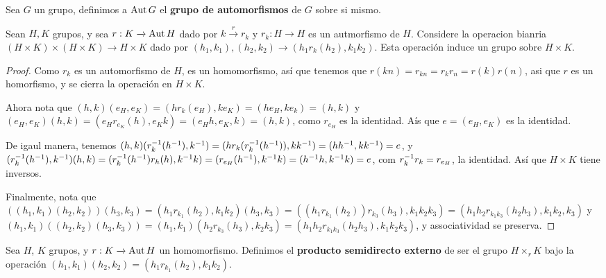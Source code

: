 \begin{definition}
    Sea $G$ un grupo, definimos a $\operatorname{Aut}{G}$ el \textbf{grupo de automorfismos}
    de $G$ sobre si mismo.
\end{definition}

\begin{lemma}\label{}
    Sean $H,K$ grupos, y sea  $r:K \xrightarrow{} \operatorname{Aut}{H}$ dado por $k
    \xrightarrow{r} r_k$ y $r_k:H \xrightarrow{} H$ es un autmorfismo de $H$.
    Considere la operacion bianria  $(H \times K) \times (H \times K)
    \xrightarrow{} H \times K$ dado por $(h_1,k_1),(h_2,k_2) \xrightarrow{}
    (h_1r_k(h_2),k_1k_2)$. Esta operaci\'on induce un grupo sobre $H \times K$.
\end{lemma}
\begin{proof}
    Como $r_k$ es un automorfismo de  $H$, es un homomorfismo, as\'i que tenemos
    que  $r(kn)=r_{kn}=r_kr_n=r(k)r(n)$, as\;i que $r$ es un homorfismo, y se
    cierra la operaci\'on en  $H \times K$.

    Ahora nota que
    $(h,k)(e_H,e_K)=(hr_k(e_H),ke_K)=(he_H,ke_k)=(h,k)$ y
    $(e_H,e_K)(h,k)=(e_Hr_{e_K}(h), e_Kk)=(e_Hh,e_K,k)=(h,k)$, como $r_{e_H}$ es
    la identidad. A\'is que $e=(e_H,e_K)$ es la identidad.

    De igaul manera, tenemos $(h,k)(r_k^{-1}(h^{-1}),
    k^{-1})=(hr_k(r_k^{-1}(h^{-1})), kk^{-1})=(hh^{-1},kk^{-1})=e$, y
    $(r_k^{-1}(h^{-1}),k^{-1})(h,k)=(r_k^{-1}(h^{-1})r_h(h),
    k^{-1}k)=(r_{e_H}(h^{-1}),k^{-1}k)=(h^{-1}h,k^{-1}k)=e$, com
    $r_k^{-1}r_k=r_{e_H}$, la identidad. As\'i que $H \times K$ tiene inversos.

    Finalmente, nota que  $((h_1,k_1)(h_2,k_2))(h_3,k_3)=(h_1r_{k_1}(h_2),
    k_1k_2)(h_3,k_3)=((h_1r_{k_1}(h_2))r_{k_3}(h_3),k_1k_2k_3)=(h_1h_2r_{k_1k_3}(h_2h_3),
    k_1k_2,k_3)$ y
    $(h_1,k_1)((h_2,k_2)(h_3,k_3))=(h_1,k_1)(h_2r_{k_3}(h_3),
    k_2k_3)=(h_1h_2r_{k_1k_3}(h_2h_3),k_1k_2k_3)$, y associatividad se preserva.
\end{proof}

\begin{definition}
    Sea $H$,  $K$ grupos, y  $r:K \xrightarrow{} \operatorname{Aut}{H}$ un homomorfismo.
    Definimos el \textbf{producto semidirecto externo} de ser el grupo $H
    \times_r K$ bajo la operaci\'on
    $(h_1,k_1)(h_2,k_2)=(h_1r_{k_1}(h_2),k_1k_2)$.
\end{definition}


